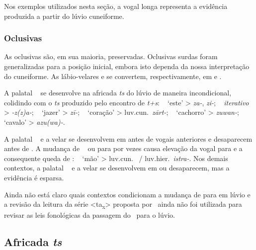 Nos exemplos utilizados nesta seção, a vogal longa representa a evidência
produzida a partir do lúvio cuneiforme.


\subsubsection{Oclusivas}

As oclusivas são, em sua maioria, preservadas.
Oclusivas surdas foram generalizadas para a posição inicial, embora isto dependa
da nossa interpretação do cuneiforme.
As lábio-velares
 e  se convertem,
respectivamente, em  e .

A palatal \pac~ se desenvolve na africada \emph{ts}
do lúvio de maneira incondicional, colidindo com o \emph{ts} produzido pelo
encontro de \emph{t+s}:
\pac~ `este' >
\emph{za-}, \emph{zi-};
\pac~ \emph{iterativo} >
\emph{-z{(z)}a-};
\pac~ `jazer' > \emph{zī-};
\pac~ `coração' > luv.cun.\ \emph{zārt-};
\pac~ `cachorro' > \emph{zuwan-};
\pac~ `cavalo' > \emph{azu{(wa)}-}.

A palatal \pac~ e a velar
 se desenvolvem em  antes de vogais
anteriores e desaparecem antes de .
A mudança de \pac~ ou 
para  por vezes causa elevação da vogal  para
 e a consequente queda de :
\pac~ `mão' >
luv.cun.\ \emph{} \slash{} luv.hier.\ \emph{istra-}.
Nos demais contextos, a palatal \pac~ e a velar
 se desenvolvem em  ou desaparecem,
mas a evidência é esparsa.

Ainda não está claro quais contextos condicionam a mudança de
 para  em lúvio e a revisão da leitura da
série <ta\textsubscript{x}> proposta por~\citet{Rieken2008} ainda não foi
utilizada para revisar as leis fonológicas da passagem do \pac~para o lúvio.

\subsection{Africada \emph{ts}}


